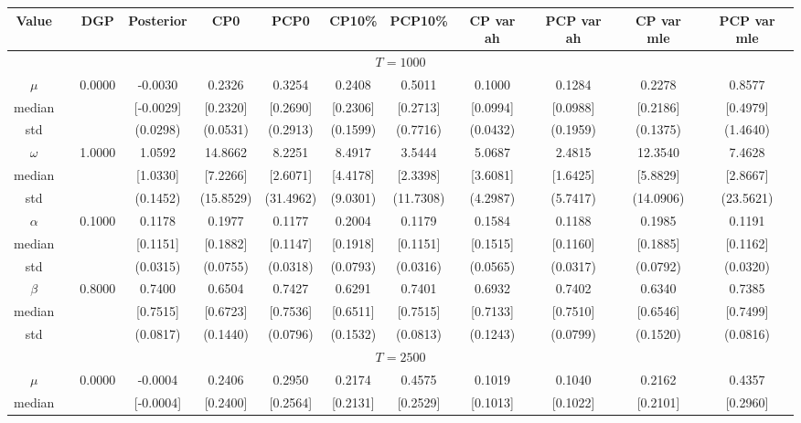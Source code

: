 { \renewcommand{\arraystretch}{1.2} 
\begin{sidewaystable} 
\center 
\begin{tabular}{cc cc cccc cccc} 
Value && DGP & Posterior & CP0  & PCP0 & CP10\%  & PCP10\% &CP var ah & PCP var ah & CP var mle & PCP var mle \\ \hline 
\hline 
\multicolumn{12}{c}{$T =1000$}  \\ 
\hline 
$\mu$&& 0.0000 & -0.0030 & 0.2326 & 0.3254 & 0.2408 & 0.5011 & 0.1000 & 0.1284 & 0.2278 & 0.8577  \\ 
median &&  & [-0.0029] & [0.2320] & [0.2690] & [0.2306] & [0.2713] & [0.0994] & [0.0988] & [0.2186] & [0.4979]  \\ 
std &&   & (0.0298) & (0.0531) & (0.2913) & (0.1599) & (0.7716) &(0.0432) & (0.1959) & (0.1375) & (1.4640)  \\ 
$\omega$&& 1.0000 & 1.0592 & 14.8662 & 8.2251 & 8.4917 & 3.5444 & 5.0687 & 2.4815 & 12.3540 & 7.4628  \\ 
median &&  & [1.0330] & [7.2266] & [2.6071] & [4.4178] & [2.3398] & [3.6081] & [1.6425] & [5.8829] & [2.8667]  \\ 
std &&   & (0.1452) & (15.8529) & (31.4962) & (9.0301) & (11.7308) &(4.2987) & (5.7417) & (14.0906) & (23.5621)  \\ 
$\alpha$&& 0.1000 & 0.1178 & 0.1977 & 0.1177 & 0.2004 & 0.1179 & 0.1584 & 0.1188 & 0.1985 & 0.1191  \\ 
median &&  & [0.1151] & [0.1882] & [0.1147] & [0.1918] & [0.1151] & [0.1515] & [0.1160] & [0.1885] & [0.1162]  \\ 
std &&   & (0.0315) & (0.0755) & (0.0318) & (0.0793) & (0.0316) &(0.0565) & (0.0317) & (0.0792) & (0.0320)  \\ 
$\beta$&& 0.8000 & 0.7400 & 0.6504 & 0.7427 & 0.6291 & 0.7401 & 0.6932 & 0.7402 & 0.6340 & 0.7385  \\ 
median &&  & [0.7515] & [0.6723] & [0.7536] & [0.6511] & [0.7515] & [0.7133] & [0.7510] & [0.6546] & [0.7499]  \\ 
std &&   & (0.0817) & (0.1440) & (0.0796) & (0.1532) & (0.0813) &(0.1243) & (0.0799) & (0.1520) & (0.0816)  \\ 
\hline 
\multicolumn{12}{c}{$T =2500$}  \\ 
\hline 
$\mu$&& 0.0000 & -0.0004 & 0.2406 & 0.2950 & 0.2174 & 0.4575 & 0.1019 & 0.1040 & 0.2162 & 0.4357  \\ 
median &&  & [-0.0004] & [0.2400] & [0.2564] & [0.2131] & [0.2529] & [0.1013] & [0.1022] & [0.2101] & [0.2960]  \\ 

\end{tabular}
\end{sidewaystable}}
